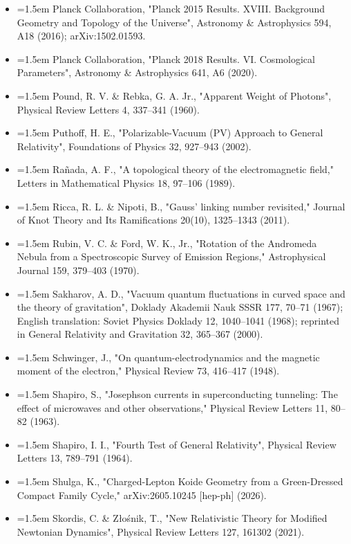 \documentclass[11pt,a4paper]{article}
\begin{document}
\begin{itemize}[leftmargin=1.5em,label={}]
\item \hangindent=1.5em Planck Collaboration, "Planck 2015 Results. XVIII. Background Geometry and Topology of the Universe", Astronomy \& Astrophysics 594, A18 (2016); arXiv:1502.01593.
\item \hangindent=1.5em Planck Collaboration, "Planck 2018 Results. VI. Cosmological Parameters", Astronomy \& Astrophysics 641, A6 (2020).
\item \hangindent=1.5em Pound, R. V. \& Rebka, G. A. Jr., "Apparent Weight of Photons", Physical Review Letters 4, 337–341 (1960).
\item \hangindent=1.5em Puthoff, H. E., "Polarizable-Vacuum (PV) Approach to General Relativity", Foundations of Physics 32, 927–943 (2002).
\item \hangindent=1.5em Rañada, A. F., "A topological theory of the electromagnetic field," Letters in Mathematical Physics 18, 97–106 (1989).
\item \hangindent=1.5em Ricca, R. L. \& Nipoti, B., "Gauss' linking number revisited," Journal of Knot Theory and Its Ramifications 20(10), 1325–1343 (2011).
\item \hangindent=1.5em Rubin, V. C. \& Ford, W. K., Jr., "Rotation of the Andromeda Nebula from a Spectroscopic Survey of Emission Regions," Astrophysical Journal 159, 379–403 (1970).
\item \hangindent=1.5em Sakharov, A. D., "Vacuum quantum fluctuations in curved space and the theory of gravitation", Doklady Akademii Nauk SSSR 177, 70–71 (1967); English translation: Soviet Physics Doklady 12, 1040–1041 (1968); reprinted in General Relativity and Gravitation 32, 365–367 (2000).
\item \hangindent=1.5em Schwinger, J., "On quantum-electrodynamics and the magnetic moment of the electron," Physical Review 73, 416–417 (1948).
\item \hangindent=1.5em Shapiro, S., "Josephson currents in superconducting tunneling: The effect of microwaves and other observations," Physical Review Letters 11, 80–82 (1963).
\item \hangindent=1.5em Shapiro, I. I., "Fourth Test of General Relativity", Physical Review Letters 13, 789–791 (1964).
\item \hangindent=1.5em Shulga, K., "Charged-Lepton Koide Geometry from a Green-Dressed Compact Family Cycle," arXiv:2605.10245 [hep-ph] (2026).
\item \hangindent=1.5em Skordis, C. \& Złośnik, T., "New Relativistic Theory for Modified Newtonian Dynamics", Physical Review Letters 127, 161302 (2021).

\end{itemize}
\end{document}
